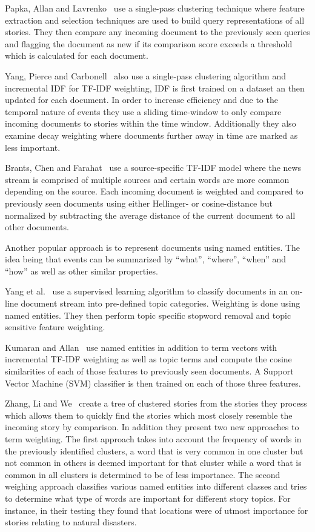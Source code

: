 Papka, Allan and Lavrenko~\cite{papka1998online} use a single-pass clustering technique where feature extraction and selection techniques are used to build query representations of all stories. They then compare any incoming document to the previously seen queries and flagging the document as new if its comparison score exceeds a threshold which is calculated for each document.

Yang, Pierce and Carbonell~\cite{yang1998study} also use a single-pass clustering algorithm and incremental IDF for TF-IDF weighting, IDF is first trained on a dataset an then updated for each document. In order to increase efficiency and due to the temporal nature of events they use a sliding time-window to only compare incoming documents to stories within the time window. Additionally they also examine decay weighting where documents further away in time are marked as less important.

Brants, Chen and Farahat~\cite{brants2003system} use a source-specific TF-IDF model where the news stream is comprised of multiple sources and certain words are more common depending on the source. Each incoming document is weighted and compared to previously seen documents using either Hellinger- or cosine-distance but normalized by subtracting the average distance of the current document to all other documents. 

Another popular approach is to represent documents using named entities. The idea being that events can be summarized  by ``what'', ``where'', ``when'' and ``how'' as well as other similar properties. 

Yang et al.~\cite{yang2002topic} use a supervised learning algorithm to classify documents in an on-line document stream into pre-defined topic categories. Weighting is done using named entities. They then perform topic specific stopword removal and topic sensitive feature weighting.

Kumaran and Allan~\cite{kumaran2005using} use named entities in addition to term vectors with incremental TF-IDF weighting as well as topic terms and compute the cosine similarities of each of those features to previously seen documents. A Support Vector Machine (SVM) classifier is then trained on each of those three features.

Zhang, Li and We~\cite{zhang2007new} create a tree of clustered stories from the stories they process which allows them to quickly find the stories which most closely resemble the incoming story by comparison. In addition they present two new approaches to term weighting. The first approach takes into account the frequency of words in the previously identified clusters, a word that is very common in one cluster but not common in others is deemed important for that cluster while a word that is common in all clusters is determined to be of less importance. The second weighing approach classifies various named entities into different classes and tries to determine what type of words are important for different story topics. For instance, in their testing they found that locations were of utmost importance for stories relating to natural disasters.

